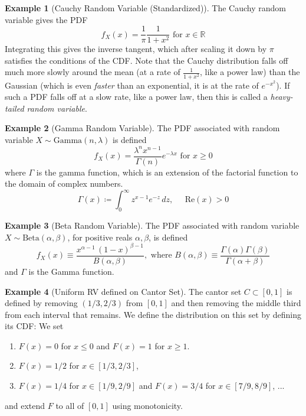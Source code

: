 \documentclass{article}
\theoremstyle{definition}
\newtheorem{example}{Example}[section]
\theoremstyle{remark}
\theoremstyle{definition}
\begin{document}
\begin{example}[Cauchy Random Variable (Standardized)]
The Cauchy random variable gives the PDF 
\[f_X (x) = \frac{1}{\pi} \frac{1}{1 + x^2} \text{ for } x \in \mathbb{R}\]
Integrating this gives the inverse tangent, which after scaling it down by $\pi$ satisfies the conditions of the CDF. Note that the Cauchy distribution falls off much more slowly around the mean (at a rate of $\frac{1}{1 + x^2}$, like a power law) than the Gaussian (which is even \textit{faster} than an exponential, it is at the rate of $e^{-x^2}$). If such a PDF falls off at a slow rate, like a power law, then this is called a \textit{heavy-tailed random variable}. 
\end{example}

\begin{example}[Gamma Random Variable]
The PDF associated with random variable $X \sim \mathrm{Gamma}(n, \lambda)$ is defined 
\[f_X(x) = \frac{\lambda^n x^{n-1}}{\Gamma(n)} e^{-\lambda x} \text{ for } x \geq 0\]
where $\Gamma$ is the gamma function, which is an extension of the factorial function to the domain of complex numbers. 
\[\Gamma(x) \coloneqq \int_{0}^\infty z^{x-1} e^{-z}\, dz, \;\;\;\;\; \text{Re}(x) > 0\]
\end{example}

\begin{example}[Beta Random Variable]
The PDF associated with random variable $X \sim \mathrm{Beta}(\alpha, \beta)$, for positive reals $\alpha, \beta$, is defined 
\[f_X (x) \equiv \frac{x^{\alpha-1} \,(1-x)^{\beta-1}}{B(\alpha, \beta)}, \text{ where } B(\alpha, \beta) \equiv \frac{\Gamma(\alpha) \Gamma(\beta)}{\Gamma(\alpha + \beta)}\]
and $\Gamma$ is the Gamma function. 
\end{example}

\begin{example}[Uniform RV defined on Cantor Set]
The cantor set $C \subset [0, 1]$ is defined by removing $(1/3, 2/3)$ from $[0, 1]$ and then removing the middle third from each interval that remains. We define the distribution on this set by defining its CDF: We set 
\begin{enumerate}
    \item $F(x) = 0$ for $x \leq 0$ and $F(x) = 1$ for $x \geq 1$. 
    \item $F(x) = 1/2$ for $x \in [1/3, 2/3]$, 
    \item $F(x) = 1/4$ for $x \in [1/9, 2/9]$ and $F(x) = 3/4$ for $x \in [7/9, 8/9]$, ... 
\end{enumerate}
and extend $F$ to all of $[0 ,1]$ using monotonicity. 
\end{example} 
\end{document}
